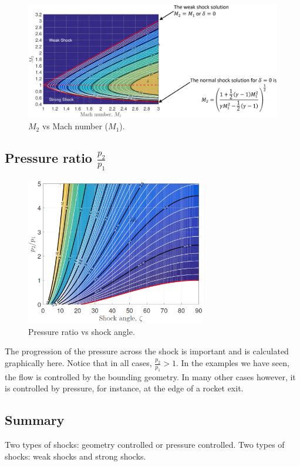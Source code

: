 \begin{figure}[H]
    \centering
    \includegraphics[width = \textwidth]{./img/diagram16.png}
    \caption{$M_2$ vs Mach number ($M_1$).}
\end{figure}
\subsection{Pressure ratio $\frac{p_2}{p_1}$}
\begin{figure}[H]
    \centering
    \includegraphics[width = 0.7\textwidth]{./img/diagram17.png}
    \caption{Pressure ratio vs shock angle.}
\end{figure}
The progression of the pressure across the shock is important and is calculated graphically here. Notice that in all cases, $\frac{p_2}{p_1}>1$. In the examples we have seen, the flow is controlled by the bounding geometry. In many other cases however, it is controlled by pressure, for instance, at the edge of a rocket exit.
\subsection{Summary}
Two types of shocks: geometry controlled or pressure controlled.
Two types of shocks: weak shocks and strong shocks.